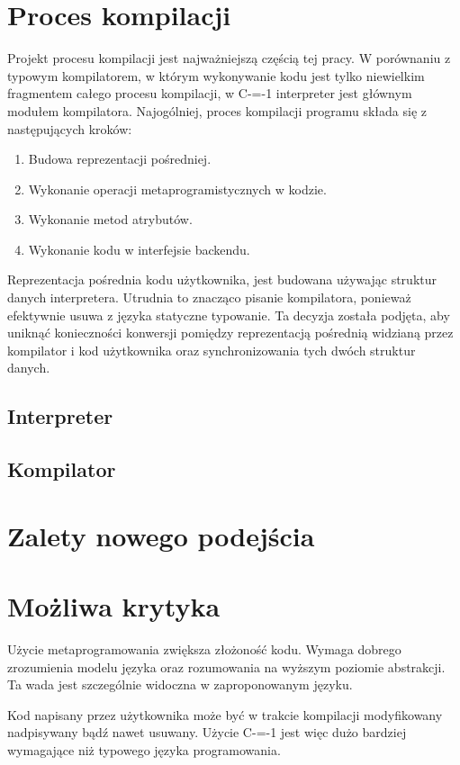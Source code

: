\documentclass[conference]{IEEEtran}
\begin{document}
\section{Proces kompilacji}

Projekt procesu kompilacji jest najważniejszą częścią tej pracy.
W porównaniu z typowym kompilatorem, w którym wykonywanie kodu jest tylko niewielkim fragmentem całego procesu kompilacji, w C-=-1 interpreter jest głównym modułem kompilatora.
Najogólniej, proces kompilacji programu składa się z następujących kroków:
\begin{enumerate}
    \item Budowa reprezentacji pośredniej.
    \item Wykonanie operacji metaprogramistycznych w kodzie.
    \item Wykonanie metod atrybutów.
    \item Wykonanie kodu w interfejsie backendu.
\end{enumerate}

Reprezentacja pośrednia kodu użytkownika, jest budowana używając struktur danych interpretera.
Utrudnia to znacząco pisanie kompilatora, ponieważ efektywnie usuwa z języka statyczne typowanie.
Ta decyzja została podjęta, aby uniknąć konieczności konwersji pomiędzy reprezentacją pośrednią widzianą przez kompilator i kod użytkownika oraz synchronizowania tych dwóch struktur danych.


\subsection{Interpreter}
\subsection{Kompilator}
\section{Zalety nowego podejścia}
\section{Możliwa krytyka}

Użycie metaprogramowania zwiększa złożoność kodu.
Wymaga dobrego zrozumienia modelu języka oraz rozumowania na wyższym poziomie abstrakcji.
Ta wada jest szczególnie widoczna w zaproponowanym języku.

Kod napisany przez użytkownika może być w trakcie kompilacji modyfikowany nadpisywany bądź nawet usuwany.
Użycie C-=-1 jest więc dużo bardziej wymagające niż typowego języka programowania.
\end{document}
